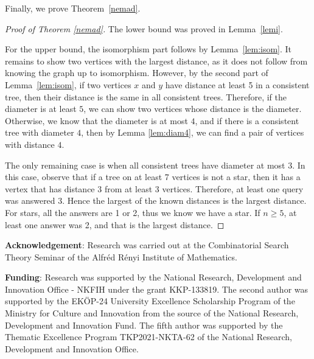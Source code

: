 \documentclass[12pt,a4paper]{amsart}
\theoremstyle{plain}
\theoremstyle{definition}
\begin{document}
Finally, we prove Theorem~\ref{nemad}.

\begin{proof}[Proof of Theorem \ref{nemad}]

The lower bound was proved in Lemma~\ref{lemi}. 

For the upper bound, the isomorphism part follows by Lemma~\ref{lem:isom}.
It remains to show two vertices with the largest distance, as it does not follow from knowing the graph up to isomorphism. However, by the second part of Lemma~\ref{lem:isom}, if two vertices $x$ and $y$ have distance at least 5 in a consistent tree, then their distance is the same in all consistent trees. 
Therefore, if the diameter is at least $5$, we can show two vertices whose distance is the diameter. Otherwise, we know that the diameter is at most $4$, and if there is a consistent tree with diameter $4$, then by Lemma \ref{lem:diam4}, we can find a pair of vertices with distance $4$. 

The only remaining case is when all consistent trees have diameter at most $3$. In this case, observe that if a tree on at least 7 vertices is not a star, then it has a vertex that has distance 3 from at least 3 vertices. Therefore, at least one query was answered 3. Hence the largest of the known distances is the largest distance. For stars, all the answers are 1 or 2, thus we know we have a star. If $n\ge 5$, at least one answer was 2, and that is the largest distance.


\end{proof}

\smallskip
\textbf{Acknowledgement}: Research was carried out at the Combinatorial Search Theory Seminar of the Alfr\'ed R\'enyi Institute of Mathematics. 

\smallskip
\textbf{Funding}: Research was supported by the National Research, Development and Innovation Office - NKFIH under the grant KKP-133819. The second author was supported by the EKÖP-24 University Excellence Scholarship Program of the
Ministry for Culture and Innovation from the source of the National
Research, Development and Innovation Fund.
The fifth author was supported by the Thematic Excellence Program TKP2021-NKTA-62 of the National Research, Development and Innovation Office.
\end{document}
